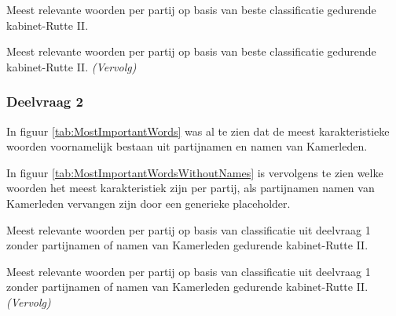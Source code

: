 \begin{table}[H]
\caption{Meest relevante woorden per partij op basis van beste classificatie gedurende kabinet-Rutte II.} 
\label{tab:MostImportantWords} 
\centering
\hspace*{-1in}
 
\end{table} 
\addtocounter{table}{-1} 
\begin{table}[H]
\caption{Meest relevante woorden per partij op basis van beste classificatie gedurende kabinet-Rutte II. \emph{(Vervolg)}} 
\centering
\hspace*{-1in}
 
\end{table}

\subsubsection{Deelvraag 2}
In figuur \ref{tab:MostImportantWords} was al te zien dat de meest karakteristieke woorden voornamelijk bestaan uit partijnamen en namen van Kamerleden. 



In figuur \ref{tab:MostImportantWordsWithoutNames} is vervolgens te zien welke woorden het meest karakteristiek zijn per partij, als partijnamen namen van Kamerleden vervangen zijn door een generieke placeholder.
\begin{table}[H] 
\caption{Meest relevante woorden per partij op basis van classificatie uit deelvraag 1 zonder partijnamen of namen van Kamerleden gedurende kabinet-Rutte II.} 
\label{tab:MostImportantWordsWithoutNames} 
\centering
\hspace*{-1in}
 
\end{table} 
\addtocounter{table}{-1} 
\begin{table}[H] 
\caption{Meest relevante woorden per partij op basis van classificatie uit deelvraag 1 zonder partijnamen of namen van Kamerleden gedurende kabinet-Rutte II. \emph{(Vervolg)}} 
\centering
\hspace*{-0.6in}
 
\end{table}


